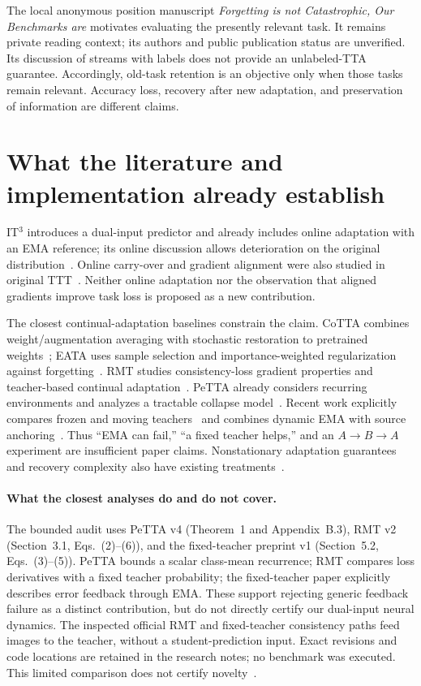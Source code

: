 \documentclass[11pt,a4paper]{article}
\begin{document}
The local anonymous position manuscript \emph{Forgetting is not Catastrophic,
Our Benchmarks are} motivates evaluating the presently relevant task.
It remains private reading context; its authors and public publication
status are unverified. Its discussion of streams with labels does not
provide an unlabeled-TTA guarantee. Accordingly, old-task retention is an
objective only when those tasks remain relevant. Accuracy loss, recovery
after new adaptation, and preservation of information are different claims.

\section{What the literature and implementation already establish}
IT$^3$ introduces a dual-input predictor and already includes online
adaptation with an EMA reference; its online discussion allows deterioration
on the original distribution~\cite{it3}. Online carry-over and gradient
alignment were also studied in original TTT~\cite{ttt}. Neither online
adaptation nor the observation that aligned gradients improve task loss
is proposed as a new contribution.

The closest continual-adaptation baselines constrain the claim. CoTTA
combines weight/augmentation averaging with stochastic restoration to
pretrained weights~\cite{cotta}; EATA uses sample selection and
importance-weighted regularization against forgetting~\cite{eata}.
RMT studies consistency-loss gradient properties and teacher-based
continual adaptation~\cite{rmt}. PeTTA already considers recurring
environments and analyzes a tractable collapse model~\cite{petta}.
Recent work explicitly compares frozen and moving teachers~\cite{fixedteacher}
and combines dynamic EMA with source anchoring~\cite{desa}. Thus ``EMA can
fail,'' ``a fixed teacher helps,'' and an $A\to B\to A$ experiment are
insufficient paper claims. Nonstationary adaptation guarantees and recovery
complexity also have existing treatments~\cite{realign,recovery}.

\paragraph{What the closest analyses do and do not cover.}
The bounded audit uses PeTTA v4 (Theorem~1 and Appendix~B.3), RMT v2
(Section~3.1, Eqs.~(2)--(6)), and the fixed-teacher preprint v1
(Section~5.2, Eqs.~(3)--(5)). PeTTA bounds a scalar class-mean recurrence;
RMT compares loss derivatives with a fixed teacher probability;
the fixed-teacher paper explicitly describes error feedback through EMA.
These support rejecting generic feedback failure as a distinct contribution,
but do not directly certify our dual-input neural dynamics.
The inspected official RMT and fixed-teacher consistency paths feed images
to the teacher, without a student-prediction input. Exact revisions and code
locations are retained in the research notes; no benchmark was executed.
This limited comparison does not certify novelty~\cite{petta,rmt,fixedteacher}.
\end{document}
